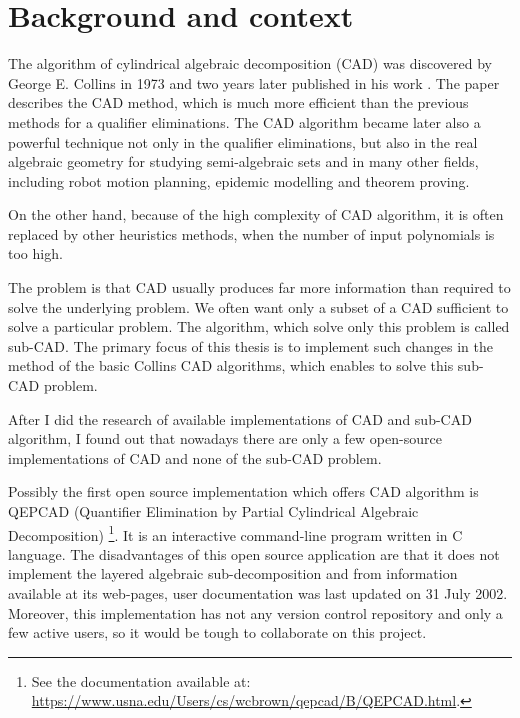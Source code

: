 \documentclass[
  digital, %
  twoside, %
  table,   %
  nolof,     %
  nolot,     %
]{fithesis3}
\begin{document}
\newtheorem{theorem}{Theorem}[section] %
\newtheorem{lemma}[theorem]{Lemma}         %
\newtheorem{corollary}[theorem]{Corollary} %
\theoremstyle{definition}
\newtheorem{definition}{Definition}
\theoremstyle{remark}
\newtheorem*{remark}{Remark}


\chapter{Background and context}
The algorithm of cylindrical algebraic decomposition (CAD) was discovered by George E. Collins in 1973 and two years later published in his work . The paper describes the CAD method, which is much more efficient than the previous methods for a qualifier eliminations\cite{10.1007/3-540-07407-4_17}. The CAD algorithm became later also a powerful technique not only in the qualifier eliminations, but also in the real algebraic geometry for studying semi-algebraic sets and in many other fields, including robot motion planning\cite{LaValle:2006:PA:1213331},
epidemic modelling\cite{epidemicModeling} and theorem proving\cite{10.1007/978-3-642-32347-8_1}.

On the other hand, because of the high complexity of CAD algorithm, it is often replaced by other heuristics methods, when the number of input polynomials is too high.

The problem is that CAD usually produces far more information than required to solve the underlying problem\cite{Wilson2014}. We often want only a subset of a CAD sufficient to solve a particular problem. The algorithm, which solve only this problem is called sub-CAD. The primary focus of this thesis is to implement such changes in the method of the basic Collins CAD algorithms, which enables to solve this sub-CAD problem. 

After I did the research of available implementations of CAD and sub-CAD algorithm, I found out that nowadays there are only a few open-source implementations of CAD and none of the sub-CAD problem.

Possibly the first open source implementation which offers CAD algorithm is QEPCAD (Quantifier Elimination by Partial Cylindrical Algebraic Decomposition)
\footnote{
  See the documentation available at: \url{https://www.usna.edu/Users/cs/wcbrown/qepcad/B/QEPCAD.html}.
}. It is an interactive command-line program written in C language. The disadvantages of this open source application are that it does not implement the layered algebraic sub-decomposition and from information available at its web-pages, user documentation was last updated on 31 July 2002. Moreover, this implementation has not any version control repository and only a few active users, so it would be tough to collaborate on this project.
\end{document}
